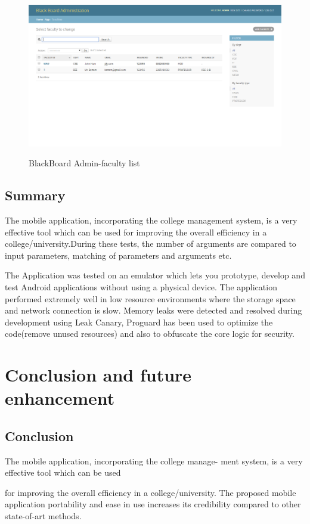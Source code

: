 \documentclass[BTech]{srmuthesis}
\begin{document}
\begin{figure}[htbp]
	\centering
	\includegraphics[width=\linewidth, height=7cm,keepaspectratio]{facultylist}
	\caption{BlackBoard Admin-faculty list}
	\label{fig:django-dash}
\end{figure}
\section{Summary}
The mobile application, incorporating the college
management system, is a very effective tool
which can be used for improving the overall efficiency in a college/university.During these tests, the number of arguments are compared to input parameters, matching of parameters and arguments etc.

The Application was tested on an emulator which lets you prototype, develop and test Android applications without using a physical device. The application performed extremely well in low resource environments where the storage space and network connection is slow. Memory leaks were detected and resolved during development using Leak Canary, Proguard has been used to optimize the code(remove unused resources) and also to obfuscate the core logic for security.


\chapter{Conclusion and future enhancement}
\section{Conclusion}
The mobile application, incorporating the college manage-
ment system, is a very effective tool which can be used

for improving the overall efficiency in a college/university.
The proposed mobile application portability and ease in use
increases its credibility compared to other state-of-art methods.
\end{document}
